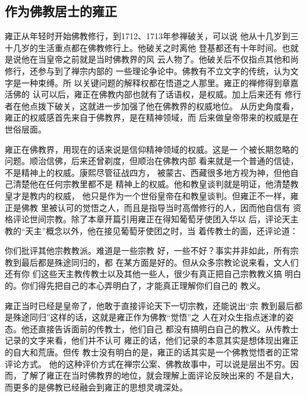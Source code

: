 \subsection{作为佛教居士的雍正}
\par
雍正从年轻时开始佛教修行，到1712、1713年参禅破关，可以说%
他从十几岁到三十几岁的生活重点都在佛教修行上。他破关之时离他%
登基都还有十年时间。也就是说他在当皇帝之前就是当时佛教界的风%
云人物了。他破关后不仅指点其他和尚修行，还参与到了禅宗内部的%
一些理论争论中。佛教有不立文字的传统，认为文字是一种束缚。所%
以关键问题的解释权都在悟道之人那里。雍正的禅修得到章嘉活佛的%
认可以后，雍正在佛教内部也就有了话语权，是权威。加上后来还有%
修行者在他点拨下破关，这就进一步加强了他在佛教界的权威地位。%
从历史角度看，雍正的权威感首先来自于佛教界，是在精神领域，而%
后来做皇帝带来的权威是在世俗层面。%
\par
雍正在佛教界，用现在的话来说是信仰精神领域的权威。这是一%
个被长期忽略的问题。顺治信佛，后来还曾剃度，但顺治在佛教内部%
看来就是一个普通的信徒，不是精神上的权威。康熙尽管征战四方，%
被蒙古、西藏很多地方视为神，但他自己清楚他在任何宗教里都不是%
精神上的权威。他和教皇谈判就是明证，他清楚教皇才是教内的权威，%
他只是作为一个世俗皇帝在和教皇谈判。但雍正不一样，雍正是佛教%
里被认可的觉悟之人，而且是指导当时高僧修行的人，因而他自信有%
资格评论世间宗教。除了本章开篇引用雍正在得知葡萄牙使团入华以%
后，评论天主教的“天主”概念以外，他在接见葡萄牙使团之时，当%
着传教士的面，还评论道：%
\par
{\bookkai {}你们批评其他宗教教派。难道是一些宗教}%
{\bookkai 好，一些不好？事实并非如此，所有宗教到最后都是殊途同归的，都}%
{\bookkai 在某方面是好的。但从众多宗教论说来看，文人们还有你}%
{\bookkai 们这些天主教传教士以及其他一些人，很少有真正把自己宗教教义搞}%
{\bookkai 明白的。你们得先把自己的本心弄明白了，才能真正理解你们自己的}%
{\bookkai 教义。}%
\par
雍正当时已经是皇帝了，他敢于直接评论天下一切宗教，还能说出“宗%
教到最后都是殊途同归”这样的话，这就是雍正作为佛教“觉悟”之%
人在对众生指点迷津的姿态。他还直接告诉面前的传教士，他们自己%
都没有搞明白自己的教义。从传教士记录的文字来看，他们并不认可%
雍正的话，他们记录的本意其实是想体现出雍正的自大和荒唐。但传%
教士没有明白的是，雍正的话其实是一个佛教觉悟者的正常评论方式。%
他的这种评价方式在禅宗公案、佛教故事中，可以说是层出不穷。因%
而，了解了雍正在当时佛教界的地位，就会理解上面评论反映出来的%
不是自大，而更多的是佛教已经融会到雍正的思想灵魂深处。%
